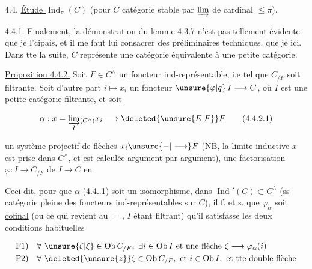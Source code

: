 
4.4. \uline{Étude } $\operatorname{Ind}_\pi(C)$ (pour $C$  catégorie stable par $\varinjlim$ de cardinal $\leq\pi$).

4.4.1. Finalement, la démonstration du lemme 4.3.7 n'est pas tellement évidente que je l'cipais, et il me faut lui consacrer des préliminaires techniques, que je  ici. Dans tte la suite, $C$ représente une catégorie équivalente à une petite catégorie.

\uline{Proposition 4.4.2.} Soit $F\in C^\wedge$ un foncteur ind-représentable, i.e tel que $C_{/F}$ soit filtrante. Soit d'autre part $i\longmapsto x_i$ un foncteur $\unsure{\varphi|q}\,I\longrightarrow C$, où $I$ est une petite catégorie filtrante, et  soit

\[
\alpha:x=\varinjlim_I{}_{\!(C^\wedge)}x_i\longrightarrow \deleted{\unsure{E|F}}F
\tag*{(4.4.2.1)}
\]


un système projectif de flèches $x_i\unsure{-|\longrightarrow} F$ (NB, la limite inductive $x$ est prise dans $C^\wedge$, et est calculée argument par \uline{argument}),   une factorisation $\varphi:I\longrightarrow C_{/F}$ de $I\longrightarrow C$ en


Ceci dit, pour que $\alpha$ (4.4..1) soit un isomorphisme, dans $\operatorname{Ind}'(C)\subset C^\wedge$ (ss-catégorie pleine des foncteurs ind-représentables sur $C$), il f. et s. que $\varphi_\alpha$ soit \uline{cofinal} (ou ce qui revient au $=$, $I$ étant filtrant) qu'il satisfasse les deux conditions habituelles

\[
\begin{aligned}
\mathrm{F1})\quad &\forall\ \unsure{\zeta|\xi}\in\operatorname{Ob} C_{/F},\ \exists i\in\operatorname{Ob} I\text{ et une flèche }\zeta\longrightarrow\varphi_\alpha(i)\\
\mathrm{F2})\quad &\forall\ \deleted{\unsure{z}}\zeta\in\operatorname{Ob} C_{/F},\ \text{et }i\in\operatorname{Ob} I,\text{ et tte double flèche}
\end{aligned}
\]

